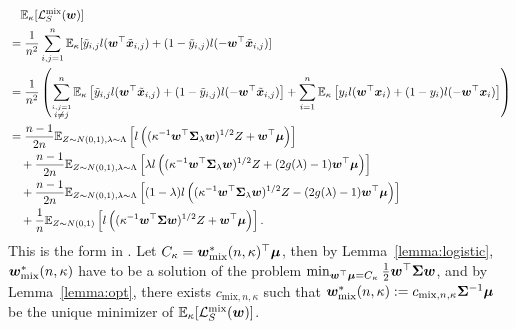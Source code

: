 \begin{align}\label{eqn:mix}
    &\quad \mathbb{E}_\kappa[\mathcal{L}_S^\mathrm{mix}({\bm{w}})] \nonumber \\
    &= \frac{1}{n^2} \sum_{i,j=1}^n\mathbb{E}_\kappa[\tilde{y}_{i,j}l({\bm{w}}^\top \tilde{{\bm{x}}}_{i,j}) + (1-\tilde{y}_{i,j}) l(-{\bm{w}}^\top \tilde{{\bm{x}}}_{i,j})]\nonumber \\
    &= \frac{1}{n^2} \left ( \sum_{\overset{i,j=1}{i \neq j}}^n\mathbb{E}_\kappa \left [\tilde{y}_{i,j} l({\bm{w}}^\top \tilde{{\bm{x}}}_{i,j}) + (1-\tilde{y}_{i,j}) l(-{\bm{w}}^\top \tilde{{\bm{x}}}_{i,j}) \right ] + \sum_{i=1}^n \mathbb{E}_\kappa \left [y_i l({\bm{w}}^\top {\bm{x}}_i) + (1-y_i) l(-{\bm{w}}^\top {\bm{x}}_i)\right ]\right)\nonumber\\
    &= \frac{n-1}{2n} \mathbb{E}_{Z \sim N(0,1), \lambda \sim \Lambda } \left [l \left ( (\kappa^{-1} {\bm{w}}^\top {\bm{\Sigma}}_\lambda {\bm{w}})^{1/2} Z + {\bm{w}}^\top {\bm{\mu}} \right ) \right ]\nonumber \\
    &\quad+ \frac{n-1}{2n} \mathbb{E}_{Z \sim N(0,1), \lambda \sim \Lambda } \left [\lambda l \left ( (\kappa^{-1} {\bm{w}}^\top {\bm{\Sigma}}_\lambda {\bm{w}})^{1/2} Z + (2g(\lambda)-1) {\bm{w}}^\top {\bm{\mu}} \right ) \right ]\nonumber \\
    &\quad+ \frac{n-1}{2n} \mathbb{E}_{Z \sim N(0,1), \lambda \sim \Lambda } \left [(1-\lambda) l \left ( (\kappa^{-1} {\bm{w}}^\top {\bm{\Sigma}}_\lambda {\bm{w}})^{1/2} Z -(2g(\lambda)-1) {\bm{w}}^\top {\bm{\mu}} \right) \right ]\nonumber \\
    &\quad+ \frac{1}{n} \mathbb{E}_{Z \sim N(0,1) }\left[ l \left ( (\kappa^{-1} {\bm{w}}^\top {\bm{\Sigma}} {\bm{w}})^{1/2} Z + {\bm{w}}^\top {\bm{\mu}} \right )\right].
\end{align}
 This is the form in . Let $C_\kappa = {\bm{w}}^*_\mathrm{mix}(n,\kappa)^\top {\bm{\mu}}$, then by Lemma~\ref{lemma:logistic}, ${\bm{w}}^*_\mathrm{mix}(n,\kappa)$ have to be a solution of the problem $\min_{{\bm{w}}^\top {\bm{\mu}} = C_\kappa} \frac{1}{2}{\bm{w}}^\top {\bm{\Sigma}} {\bm{w}}$, and by Lemma~\ref{lemma:opt}, there exists $c_{\mathrm{mix}, n, \kappa}$ such that  ${\bm{w}}^*_\mathrm{mix}(n,\kappa):= c_{\mathrm{mix}, n, \kappa} {\bm{\Sigma}}^{-1} {\bm{\mu}}$ be the unique minimizer of $\mathbb{E}_\kappa[\mathcal{L}_S^\mathrm{mix}({\bm{w}})]$. 
 

